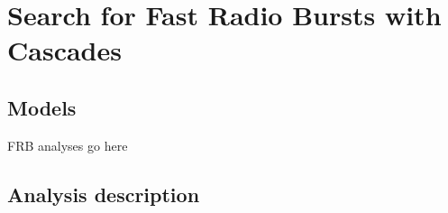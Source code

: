 \chapter{Search for Fast Radio Bursts with Cascades}
\label{sec:FRBs}


\section{Models}
\label{sec:FRBs:models}

FRB analyses go here

\section{Analysis description}
\label{sec:FRBs:analysis}